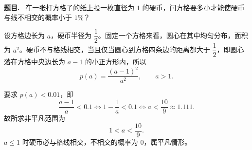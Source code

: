 \documentclass{article}
\newenvironment{problem}{\par\medskip\noindent\textbf{题目.}\ }{\par\smallskip}
\begin{document}
\begin{problem}
  在一张打方格子的纸上投一枚直径为 $1$ 的硬币，问方格要多小才能使硬币与线不相交的概率小于 $1\%$？
\end{problem}

\begin{solution}
  设方格边长为 $a$，硬币半径为 $\dfrac12$。固定一个方格来看，圆心在其中均匀分布，面积为 $a^2$。硬币不与格线相交，当且仅当圆心到方格四条边的距离都大于
  $\dfrac12$，即圆心落在方格中央边长为 $a-1$ 的小正方形内，所以
  \[
    p(a)=\frac{(a-1)^2}{a^2},\qquad a>1 .
  \]

  要求 $p(a)<0.01$，即
  \[
    \frac{a-1}{a}<0.1
    \iff 1-\frac1a<0.1
    \iff a<\frac{10}{9}\approx 1.111 .
  \]
  故所求非平凡范围为
  \[
    1<a<\frac{10}{9} .
  \]
  $a\le1$ 时硬币必与格线相交，不相交的概率为 $0$，属平凡情形。

\end{solution}
\end{document}
